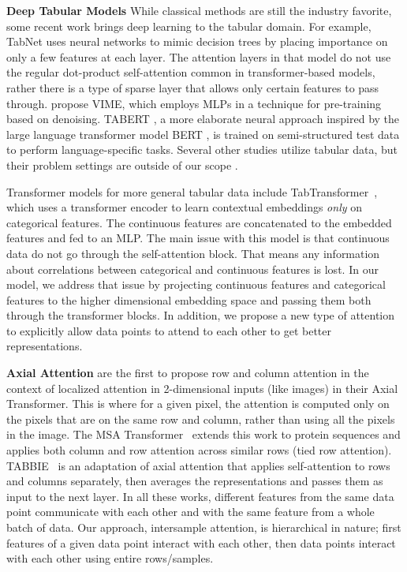 \textbf{Deep Tabular Models} While classical methods are still the industry favorite, some recent work brings deep learning to the tabular domain. For example, TabNet \cite{arik2019TabNet} uses neural networks to mimic decision trees by placing importance on only a few features at each layer. The attention layers in that model do not use the regular dot-product self-attention common in transformer-based models, rather there is a type of sparse layer that allows only certain features to pass through. \citet{yoon2020vime} propose VIME, which employs MLPs in a technique for pre-training based on denoising. TABERT \cite{yin2020tabert}, a more elaborate neural approach inspired by the large language transformer model BERT \cite{devlin2018bert}, is trained on semi-structured test data to perform language-specific tasks. Several other studies utilize tabular data, but their problem settings are outside of our scope \cite{pathak2016context,chen2019learning,padhi2021tabular,shavitt2018regularization, katzir2021netdnf}.

Transformer models for more general tabular data include TabTransformer~\cite{huang2020tabtransformer}, which uses a transformer encoder to learn contextual embeddings \emph{only} on categorical features. The continuous features are concatenated to the embedded features and fed to an MLP. The main issue with this model is that continuous data do not go through the self-attention block. That means any information about correlations between categorical and continuous features is lost. In our model, we address that issue by projecting continuous features and categorical features to the higher dimensional embedding space and passing them both through the transformer blocks. In addition, we propose a new type of attention to explicitly allow data points to attend to each other to get better representations.

\textbf{Axial Attention} \citet{ho2019axial} are the first to propose row and column attention in the context of localized attention in 2-dimensional inputs (like images) in their Axial Transformer. This is where for a given pixel, the attention is computed only on the pixels that are on the same row and column, rather than using all the pixels in the image. The MSA Transformer~\cite{rao2021msa} extends this work to protein sequences and applies both column and row attention across similar rows (tied row attention). TABBIE~\cite{iida2021tabbie} is an adaptation of axial attention that applies self-attention to rows and columns separately, then averages the representations and passes them as input to the next layer. In all these works, different features from the same data point communicate with each other and with the same feature from a whole batch of data. Our approach, intersample attention, is hierarchical in nature; first features of a given data point interact with each other, then data points interact with each other using entire rows/samples. 

